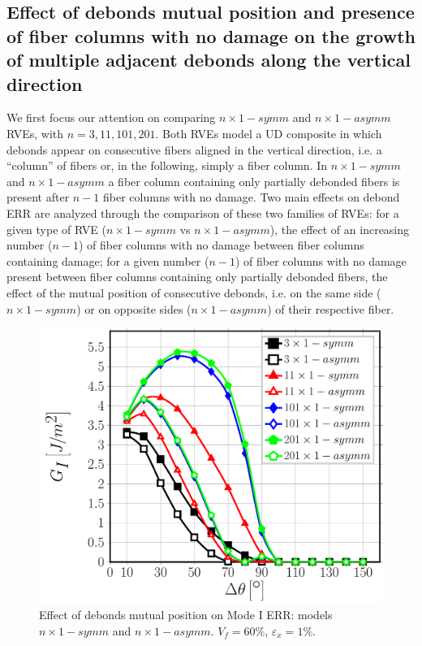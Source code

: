\documentclass[smallextended]{svjour3}       %
\begin{document}
\subsection{Effect of debonds mutual position and presence of  fiber columns with no damage on the growth of multiple adjacent debonds along the vertical direction}\label{subsec:adjacentdebonds}

We first focus our attention on comparing $n\times 1-symm$ and $n\times 1-asymm$ RVEs, with $n=3,11,101,201$. Both RVEs model a UD composite in which debonds appear on consecutive fibers aligned in the vertical direction, i.e. a ``column'' of fibers or, in the following, simply a fiber column. In $n\times 1-symm$ and $n\times 1-asymm$ a fiber column containing only partially debonded fibers is present after $n-1$ fiber columns with no damage. Two main effects on debond ERR are analyzed through the comparison of these two families of RVEs: for a given type of RVE ($n\times 1-symm$ vs $n\times 1-asymm$), the effect of an increasing number ($n-1$) of fiber columns with no damage between fiber columns containing damage; for a given number ($n-1$) of fiber columns with no damage present between fiber columns containing only partially debonded fibers, the effect of the mutual position of consecutive debonds, i.e. on the same side ($n\times 1-symm$) or on opposite sides ($n\times 1-asymm$) of their respective fiber.

\begin{figure}[!h]
\centering
\includegraphics[width=\textwidth]{nx1-coupling-vf60-GI.pdf}
\caption{Effect of debonds mutual position on Mode I ERR: models $n\times 1-symm$ and $n\times 1-asymm$. $V_{f}=60\%$, $\varepsilon_{x}=1\%$.}\label{fig:nx1GI}
\end{figure}
\end{document}
